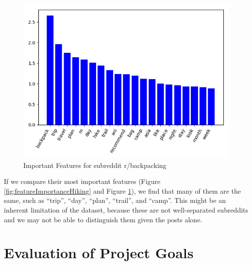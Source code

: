 \documentclass{sig-alternate-05-2015}
\begin{document}
\begin{figure}[H]
\centering
\includegraphics[width=\linewidth]{plots/coefficients-backpacking-dim-78.png}
\caption{Important Features for subreddit r/backpacking}
\label{fig:featureImportanceBackpacking}
\end{figure}

If we compare their most important features (Figure \ref{fig:featureImportanceHiking} and Figure \ref{fig:featureImportanceBackpacking}), we find that many of them are the same, such as ``trip'', ``day'', ``plan'', ``trail'', and ``camp''. This might be an inherent limitation of the dataset, because these are not well-separated subreddits and we may not be able to distinguish them given the posts alone.

\section{Evaluation of Project Goals}
\end{document}

